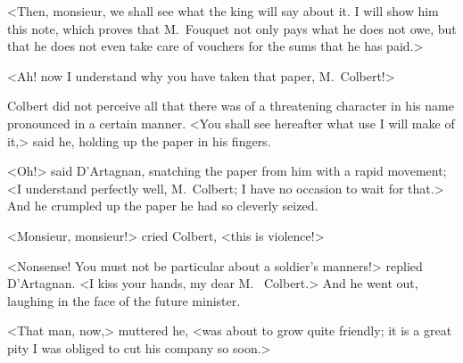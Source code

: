 <Then, monsieur, we shall see what the king will say about it. I will show him this note, which proves that M.~Fouquet not only pays what he does not owe, but that he does not even take care of vouchers for the sums that he has paid.>

<Ah! now I understand why you have taken that paper, M.~Colbert!>

Colbert did not perceive all that there was of a threatening character in his name pronounced in a certain manner. <You shall see hereafter what use I will make of it,> said he, holding up the paper in his fingers.

<Oh!> said D'Artagnan, snatching the paper from him with a rapid movement; <I understand perfectly well, M.~Colbert; I have no occasion to wait for that.> And he crumpled up the paper he had so cleverly seized.

<Monsieur, monsieur!> cried Colbert, <this is violence!>

<Nonsense! You must not be particular about a soldier's manners!> replied D'Artagnan. <I kiss your hands, my dear M.~ Colbert.> And he went out, laughing in the face of the future minister.

<That man, now,> muttered he, <was about to grow quite friendly; it is a great pity I was obliged to cut his company so soon.> 